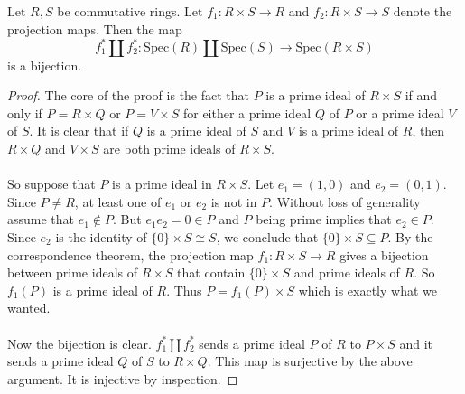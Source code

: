 \documentclass[a4paper]{article}
\begin{document}
\begin{lmm}{}{} Let $R,S$ be commutative rings. Let $f_1:R\times S\to R$ and $f_2:R\times S\to S$ denote the projection maps. Then the map $$f_1^\ast\amalg f_2^\ast:\text{Spec}(R)\amalg\text{Spec}(S)\to\text{Spec}(R\times S)$$ is a bijection. 
\begin{proof}
The core of the proof is the fact that $P$ is a prime ideal of $R\times S$ if and only if $P=R\times Q$ or $P=V\times S$ for either a prime ideal $Q$ of $P$ or a prime ideal $V$ of $S$. It is clear that if $Q$ is a prime ideal of $S$ and $V$ is a prime ideal of $R$, then $R\times Q$ and $V\times S$ are both prime ideals of $R\times S$. \\~\\

So suppose that $P$ is a prime ideal in $R\times S$. Let $e_1=(1,0)$ and $e_2=(0,1)$. Since $P\neq R$, at least one of $e_1$ or $e_2$ is not in $P$. Without loss of generality assume that $e_1\notin P$. But $e_1e_2=0\in P$ and $P$ being prime implies that $e_2\in P$. Since $e_2$ is the identity of $\{0\}\times S\cong S$, we conclude that $\{0\}\times S\subseteq P$. By the correspondence theorem, the projection map $f_1:R\times S\to R$ gives a bijection between prime ideals of $R\times S$ that contain $\{0\}\times S$ and prime ideals of $R$. So $f_1(P)$ is a prime ideal of $R$. Thus $P=f_1(P)\times S$ which is exactly what we wanted. \\~\\

Now the bijection is clear. $f_1^\ast\amalg f_2^\ast$ sends a prime ideal $P$ of $R$ to $P\times S$ and it sends a prime ideal $Q$ of $S$ to $R\times Q$. This map is surjective by the above argument. It is injective by inspection. 
\end{proof}
\end{lmm}
\end{document}
